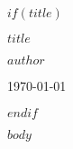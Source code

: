 \documentclass[11pt,a4paper]{article}
\begin{document}
$if(title)$
\begin{center}
\vspace*{2cm}
{\Huge\bfseries $title$\par}
\vspace{2cm}
{\Large\itshape $author$\par}
\vspace{0.5em}
{\large \today\par}
\end{center}
\vspace{2cm}
$endif$

$body$
\end{document}
